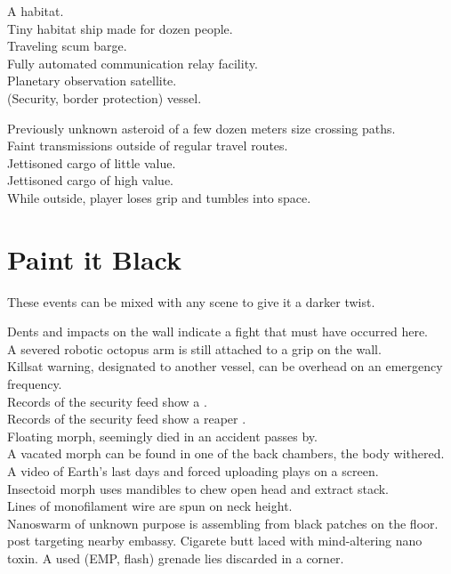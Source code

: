 \documentclass[a4]{article}
\begin{document}
\starttableone
A habitat.\\
Tiny habitat ship made for dozen people.\\
Traveling scum barge.\\
Fully automated communication relay facility.\\
Planetary observation satellite.\\
(Security, border protection) vessel.\\
\stoptableone

\starttableone
Previously unknown asteroid of a few dozen meters size crossing paths.\\
Faint transmissions outside of regular travel routes.\\
Jettisoned cargo of little value.\\
Jettisoned cargo of high value.\\
While outside, player loses grip and tumbles into space.\\
\stoptableone



\section{Paint it Black}

These events can be mixed with any scene to give it a darker twist.

\starttableone
Dents and impacts on the wall indicate a fight that must have occurred here.\\
A severed robotic octopus arm is still attached to a grip on the wall.\\
Killsat warning, designated to another vessel, can be overhead on an emergency frequency.\\
Records of the security feed show a  .\\
Records of the security feed show a reaper .\\
Floating morph, seemingly died in an accident passes by.\\
A vacated morph can be found in one of the back chambers, the body withered.\\
A video of Earth's last days and forced uploading plays on a screen.\\
Insectoid morph uses mandibles to chew open head and extract stack.\\
Lines of monofilament wire are spun on neck height.\\
Nanoswarm of unknown purpose is assembling from black patches on the floor.\\
 post targeting nearby embassy.
Cigarete butt laced with mind-altering nano toxin.
A used (EMP, flash) grenade lies discarded in a corner.\\
\stoptableone
\end{document}

